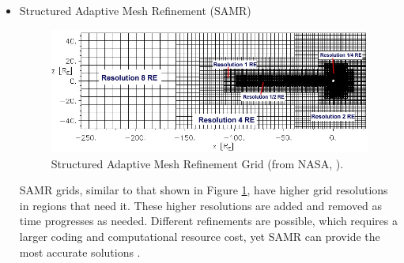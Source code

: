 \begin{itemize}
  \item Structured Adaptive Mesh Refinement (SAMR) \\
  \begin{figure}
  	\begin{centering}
  	\includegraphics[scale=0.45]{images/SAMR.JPG}
  	\caption{Structured Adaptive Mesh Refinement Grid (from NASA,
  	\citeyear{SAMR}).}
  	\label{fig:SAMR}
  	\end{centering}
  	\figSpace
  \end{figure}
  SAMR grids, similar to that shown in Figure \ref{fig:SAMR}, have higher
  grid resolutions in regions that need it. These higher resolutions are
  added and removed as time progresses as needed. Different
  refinements are possible, which requires a larger coding and computational
  resource cost, yet SAMR can provide the
  most accurate solutions \citep{Raeder2003}.
  

\end{itemize}
